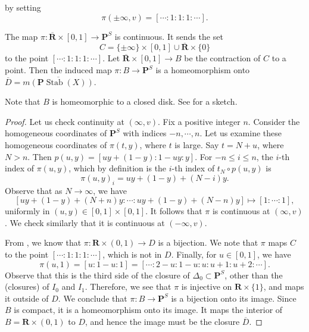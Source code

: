 \documentclass{amsart}
\begin{document}
by setting
\[ \pi (\pm \infty, v) = [\cdots : 1 : 1 : 1 : \cdots ].\]
\begin{theorem}\label{prop:pi}
  The map \(\pi \colon \overline{\mathbf{R}} \times [0,1] \to \mathbf{P}^S\) is continuous.
  It sends the set \[C = \{\pm \infty\} \times [0,1] \cup \overline{\mathbf{R}} \times \{0\}\]
  to the point \([\cdots: 1: 1: 1: \cdots]\).
  Let \(\overline{\mathbf{R}} \times [0,1] \to B\) be the contraction of \(C\) to a point.
  Then the induced map \(\pi \colon B \to \mathbf{P}^S\) is a homeomorphism onto \(\overline D = \overline{m(\mathbf{P}\operatorname{Stab}(X))}\).
\end{theorem}
Note that \(B\) is homeomorphic to a closed disk.
See  for a sketch.
\begin{proof}
  Let us check continuity at \((\infty, v)\).
  Fix a positive integer \(n\).
  Consider the homogeneous coordinates of \(\mathbf{P}^{S}\) with indices \(-n, \cdots, n\).
  Let us examine these homogeneous coordinates of \(\pi(t,y)\), where \(t\) is large.
  Say \(t = N + u\), where \(N > n\).
  Then \(p(u,y) = [uy+(1-y) : 1-uy: y]\).
  For \(-n \leq i \leq n\), the \(i\)-th index of \(\pi(u,y)\), which by definition is the \(i\)-th index of \(t_N \circ p(u,y)\) is
  \[ \pi(u,y)_i = uy + (1-y) + (N-i) y.\]
  Observe that as \(N \to \infty\), we have
  \[ [uy + (1-y) + (N+n) y : \cdots : uy + (1-y) + (N-n)y] \mapsto [1:\cdots:1],\]
  uniformly in \((u,y) \in [0,1] \times [0,1]\).
  It follows that \(\pi\) is continuous at \((\infty, v)\).
  We check similarly that it is continuous at \((-\infty, v)\).

  From , we know that \(\pi \colon \mathbf{R} \times (0,1) \to D\)  is a bijection.
  We note that \(\pi\) maps \(C\) to the point \([\cdots:1 : 1: 1: \cdots]\), which is not in \(D\).
  Finally, for \(u \in [0,1]\), we have
  \[ \pi(u,1) = [u:1-u:1] = [\cdots:2-u:1-u:u:u+1:u+2:\cdots].\]
  Observe that this is the third side of the closure of \(\Delta_0 \subset \mathbf{P}^S\), other than the (closures) of \(I_0\) and \(I_1\).
  Therefore, we see that \(\pi\) is injective on \(\mathbf{R} \times \{1\}\), and maps it outside of \(D\).
  We conclude that \(\pi \colon B \to \mathbf{P}^S\) is a bijection onto its image.
  Since \(B\) is compact, it is a homeomorphism onto its image.
  It maps the interior of \(B = \mathbf{R} \times (0,1)\) to \(D\), and hence the image must be the closure \(\overline D\).
\end{proof}
\end{document}
